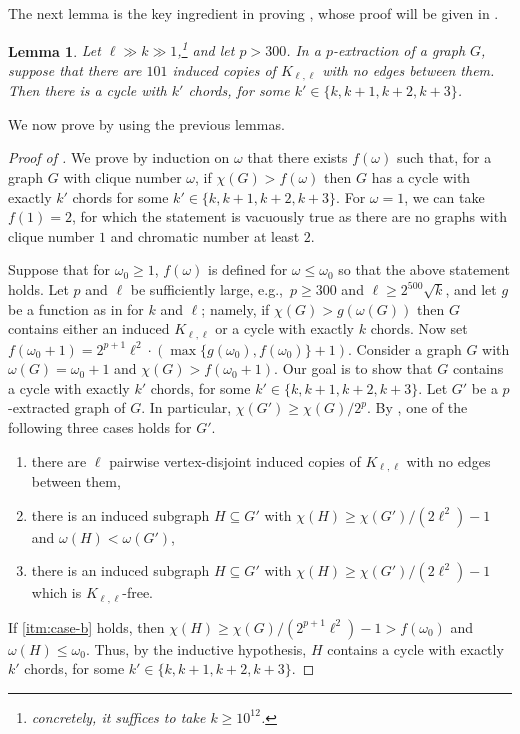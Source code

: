 \documentclass[11pt,english]{article}
\theoremstyle{plain}
\newtheorem{lem}[thm]{Lemma}
\theoremstyle{definition}
\theoremstyle{remark}
\begin{document}
    The next lemma is the key ingredient in proving , whose proof will be given in .
    
 	\begin{lem} \label{lem:finding-cycle-from-Kll}
    	Let $\ell\gg k\gg 1$,\footnote{concretely, it suffices to take $k \ge 10^{12}$. 
    	}
    	and let $p > 300$.
		In a $p$-extraction of a graph $G$, suppose that there are $101$ induced copies of $K_{\ell, \ell}$ with no edges between them. 
		Then there is a cycle with $k'$ chords, for some $k' \in \{k, k+1, k+2, k+3\}$. 
	\end{lem}
	
	We now prove  by using the previous lemmas.
    
    \begin{proof}[Proof of ]
        We prove by induction on $\omega$ that there exists $f(\omega)$ such that, for a graph $G$ with clique number $\omega$, if $\chi(G) > f(\omega)$ then $G$ has a cycle with exactly $k'$ chords for some $k' \in \{k, k+1, k+2, k+3\}$. 
        For $\omega = 1$, we can take $f(1) = 2$, for which the statement is vacuously true as there are no graphs with clique number $1$ and chromatic number at least $2$.
        
        Suppose that for $\omega_0 \ge 1$, $f(\omega)$ is defined for $\omega \le \omega_0$ so that the above statement holds.
        Let $p$ and $\ell$ be sufficiently large, e.g.,\ $p\geq 300$ and $\ell\geq 2^{500}\sqrt{k}$, and let $g$ be a function as in  for $k$ and $\ell$; namely, if $\chi(G) > g(\omega(G))$ then $G$ contains either an induced $K_{\ell,\ell}$ or a cycle with exactly $k$ chords.
        Now set $f(\omega_0+1) = 2^{p+1} \ell^2 \cdot \left(\max\{g(\omega_0), f(\omega_0)\} + 1\right)$. 
        Consider a graph $G$ with $\omega(G) = \omega_0+1$ and $\chi(G) > f(\omega_0+1)$. Our goal is to show that $G$ contains a cycle with exactly $k'$ chords, for some $k' \in \{k, k+1, k+2, k+3\}$. 
        Let $G'$ be a $p$-extracted graph of $G$. In particular, $\chi(G')\geq \chi(G)/2^p$.
        By , one of the following three cases holds for $G'$.
        \begin{enumerate}[label = \rm (G\arabic*)]
            \item \label{itm:case-a}
                there are $\ell$ pairwise vertex-disjoint induced copies of $K_{\ell, \ell}$ with no edges between them,
            \item \label{itm:case-b}
                there is an induced subgraph $H \subseteq G'$ with $\chi(H) \ge \chi(G') /(2\ell^2) - 1$ and $\omega(H) < \omega(G')$,
            \item \label{itm:case-c}
                there is an induced subgraph $H \subseteq G'$ with $\chi(H) \ge \chi(G') /(2\ell^2) - 1$ which is $K_{\ell, \ell}$-free.
        \end{enumerate}
        If \ref{itm:case-b} holds, then $\chi(H) \ge \chi(G)/(2^{p+1}\ell^2) - 1 > f(\omega_0)$ and $\omega(H) \le \omega_0$. Thus, by the inductive hypothesis, $H$ contains a cycle with exactly $k'$ chords, for some $k' \in \{k, k+1, k+2, k+3\}$.
        

\end{proof}
\end{document}
